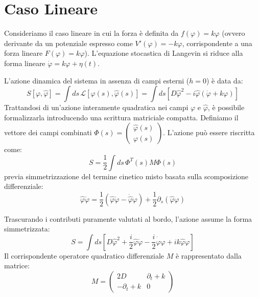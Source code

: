 \section{Caso Lineare}
Consideriamo il caso lineare in cui la forza è definita da $f(\varphi) = k\varphi$ (ovvero derivante da un potenziale espresso come $V'(\varphi)=-k\varphi$, corrispondente a una forza lineare $F(\varphi)=k\varphi$). L'equazione stocastica di Langevin si riduce alla forma lineare $\dot{\varphi} = k\varphi + \eta(t)$.

L'azione dinamica del sistema in assenza di campi esterni ($h=0$) è data da:
\begin{equation}
S[\varphi,\hat{\varphi}] = \int ds \, \mathcal{L}[\varphi(s),\hat{\varphi}(s)] = \int ds \left[ D\hat{\varphi}^2 - i\hat{\varphi}(\dot{\varphi} + k\varphi) \right]
\end{equation}
Trattandosi di un'azione interamente quadratica nei campi $\varphi$ e $\hat{\varphi}$, è possibile formalizzarla introducendo una scrittura matriciale compatta. Definiamo il vettore dei campi combinati $\Phi(s) = \begin{pmatrix} \hat{\varphi}(s) \\ \varphi(s) \end{pmatrix}$. L'azione può essere riscritta come:
\begin{equation}
S = \frac{1}{2} \int ds \, \Phi^T(s) M \Phi(s)
\end{equation}
previa simmetrizzazione del termine cinetico misto basata sulla scomposizione differenziale:
\begin{equation}
\hat{\varphi}\dot{\varphi} = \frac{1}{2}(\hat{\varphi}\dot{\varphi} - \dot{\hat{\varphi}}\varphi) + \frac{1}{2}\partial_s(\hat{\varphi}\varphi)
\end{equation}

Trascurando i contributi puramente valutati al bordo, l'azione assume la forma simmetrizzata:
\begin{equation}
S = \int ds \left[ D\hat{\varphi}^2 + \frac{i}{2}\hat{\varphi}\dot{\varphi} - \frac{i}{2}\dot{\hat{\varphi}}\varphi + ik\hat{\varphi}\varphi \right]
\label{eq:azione_lineare_simmetrizzata}
\end{equation}
Il corrispondente operatore quadratico differenziale $M$ è rappresentato dalla matrice:
\begin{equation}
M = \begin{pmatrix} 2D & \partial_t+k \\ -\partial_t+k & 0 \end{pmatrix}
\end{equation}

